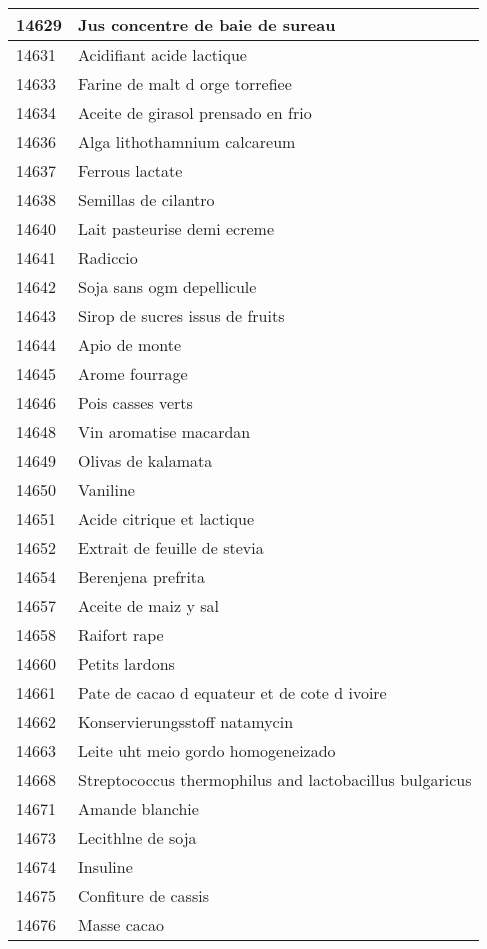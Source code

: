 \begin{longtable}{|l|l|}
14629 & Jus concentre de baie de sureau \\ \hline 
14631 & Acidifiant acide lactique \\ \hline 
14633 & Farine de malt d orge torrefiee \\ \hline 
14634 & Aceite de girasol prensado en frio \\ \hline 
14636 & Alga lithothamnium calcareum \\ \hline 
14637 & Ferrous lactate \\ \hline 
14638 & Semillas de cilantro \\ \hline 
14640 & Lait pasteurise demi ecreme \\ \hline 
14641 & Radiccio \\ \hline 
14642 & Soja sans ogm depellicule \\ \hline 
14643 & Sirop de sucres issus de fruits \\ \hline 
14644 & Apio de monte \\ \hline 
14645 & Arome fourrage \\ \hline 
14646 & Pois casses verts \\ \hline 
14648 & Vin aromatise macardan \\ \hline 
14649 & Olivas de kalamata \\ \hline 
14650 & Vaniline \\ \hline 
14651 & Acide citrique et lactique \\ \hline 
14652 & Extrait de feuille de stevia \\ \hline 
14654 & Berenjena prefrita \\ \hline 
14657 & Aceite de maiz y sal \\ \hline 
14658 & Raifort rape \\ \hline 
14660 & Petits lardons \\ \hline 
14661 & Pate de cacao d equateur et de cote d ivoire \\ \hline 
14662 & Konservierungsstoff natamycin \\ \hline 
14663 & Leite uht meio gordo homogeneizado \\ \hline 
14668 & Streptococcus thermophilus and lactobacillus bulgaricus \\ \hline 
14671 & Amande blanchie \\ \hline 
14673 & Lecithlne de soja \\ \hline 
14674 & Insuline \\ \hline 
14675 & Confiture de cassis \\ \hline 
14676 & Masse cacao \\ \hline 

\end{longtable}
